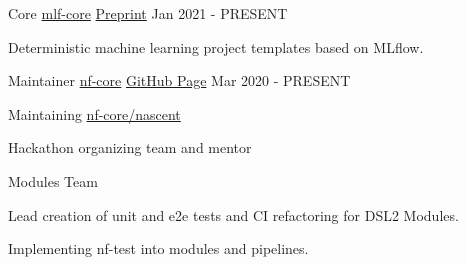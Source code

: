 

\begin{cventries}


	\cventry
	{Core} %
	{\href{https://www.mlf-core.com/index}{mlf-core}} %
	{\href{https://arxiv.org/abs/2104.07651}{Preprint}}
	{Jan 2021 - PRESENT} %
	{
		\begin{cvitems} %
			\item {Deterministic machine learning project templates based on MLflow.}
		\end{cvitems}
	}

	\cventry
	{Maintainer} %
	{\href{https://nf-co.re/}{nf-core}} %
	{\href{https://github.com/nf-core}{GitHub Page}} %
	{Mar 2020 - PRESENT} %
	{
		\begin{cvitems} %
			\item {Maintaining \href{https://nf-co.re/nascent}{nf-core/nascent}}
			\item {Hackathon organizing team and mentor}
			\item {Modules Team}
			\item {Lead creation of unit and e2e tests and CI refactoring for DSL2 Modules.}
			\item {Implementing nf-test into modules and pipelines.}
		\end{cvitems}
	}



\end{cventries}
